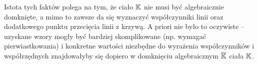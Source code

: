 \noindent
Istota tych faktów polega na tym,
że ciało $\mathbb{K}$ nie musi być algebraicznie domknięte,
a mimo to zawsze da się wyznaczyć współczynniki linii
oraz dodatkowego punktu przecięcia linii z krzywą.
A priori nie było to oczywiste --
uzyskane wzory mogły być bardziej skomplikowane (np. wymagać pierwiastkowania)
i konkretne wartości niezbędne do wyrażenia współczynników i współrzędnych
znajdowałyby się dopiero w domknięciu algebraicznym $\overline{\mathbb{K}}$
ciała $\mathbb{K}$.
